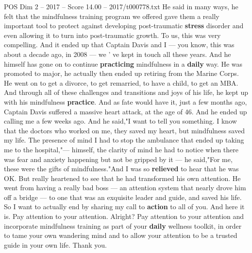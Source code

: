 \begin{textsample}{POS Dim 2 – 2017 – Score 14.00 – 2017/t000778.txt}
He said in many ways, he felt that the mindfulness training program we offered gave them a really important tool to protect against developing post-traumatic \textbf{stress} disorder and even allowing it to turn into post-traumatic growth.
To us, this was very compelling.
And it ended up that Captain Davis and I — you know, this was about a decade ago, in 2008 — we ' ve kept in touch all these years.
And he himself has gone on to continue \textbf{practicing} mindfulness in a \textbf{daily} way.
He was promoted to major, he actually then ended up retiring from the Marine Corps.
He went on to get a divorce, to get remarried, to have a child, to get an MBA.
And through all of these challenges and transitions and joys of his life, he kept up with his mindfulness \textbf{practice}.
And as fate would have it, just a few months ago, Captain Davis suffered a massive heart attack, at the age of 46.
And he ended up calling me a few weeks ago.
And he said,"I want to tell you something.
I know that the doctors who worked on me, they saved my heart, but mindfulness saved my life.
The presence of mind I had to stop the ambulance that ended up taking me to the hospital,"— himself, the clarity of mind he had to notice when there was fear and anxiety happening but not be gripped by it — he said,"For me, these were the gifts of mindfulness."And I was so \textbf{relieved} to hear that he was OK.
But really heartened to see that he had transformed his own attention.
He went from having a really bad boss — an attention system that nearly drove him off a bridge — to one that was an exquisite leader and guide, and saved his life.
So I want to actually end by sharing my call to \textbf{action} to all of you.
And here it is.
Pay attention to your attention.
Alright?
Pay attention to your attention and incorporate mindfulness training as part of your \textbf{daily} wellness toolkit, in order to tame your own wandering mind and to allow your attention to be a trusted guide in your own life.
Thank you.

\end{textsample}

